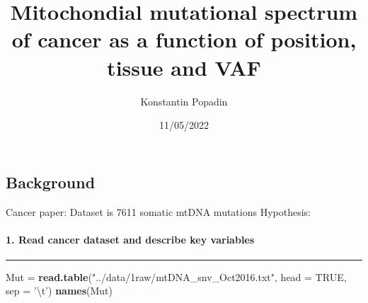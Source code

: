 \documentclass[
]{article}
\title{Mitochondial mutational spectrum of cancer as a function of position,
tissue and VAF}
\author{Konstantin Popadin}
\date{11/05/2022}
\newenvironment{Shaded}{\begin{snugshade}}{\end{snugshade}}
\newcommand{\CharTok}[1]{\textcolor[rgb]{0.31,0.60,0.02}{#1}}
\newcommand{\DataTypeTok}[1]{\textcolor[rgb]{0.13,0.29,0.53}{#1}}
\newcommand{\KeywordTok}[1]{\textcolor[rgb]{0.13,0.29,0.53}{\textbf{#1}}}
\newcommand{\NormalTok}[1]{#1}
\newcommand{\OtherTok}[1]{\textcolor[rgb]{0.56,0.35,0.01}{#1}}
\newcommand{\StringTok}[1]{\textcolor[rgb]{0.31,0.60,0.02}{#1}}
\begin{document}
\maketitle

\hypertarget{background}{%
\subsection{Background}\label{background}}

Cancer paper: Dataset is 7611 somatic mtDNA mutations Hypothesis:

\hypertarget{read-cancer-dataset-and-describe-key-variables}{%
\paragraph{1. Read cancer dataset and describe key
variables}\label{read-cancer-dataset-and-describe-key-variables}}

\begin{center}\rule{0.5\linewidth}{0.5pt}\end{center}

\begin{Shaded}
\begin{Highlighting}[]
\NormalTok{Mut =}\StringTok{ }\KeywordTok{read.table}\NormalTok{(}\StringTok{"../data/1raw/mtDNA_snv_Oct2016.txt"}\NormalTok{, }\DataTypeTok{head =} \OtherTok{TRUE}\NormalTok{, }\DataTypeTok{sep =} \StringTok{'}\CharTok{\textbackslash{}t}\StringTok{'}\NormalTok{)  }
\KeywordTok{names}\NormalTok{(Mut)}
\end{Highlighting}
\end{Shaded}
\end{document}

